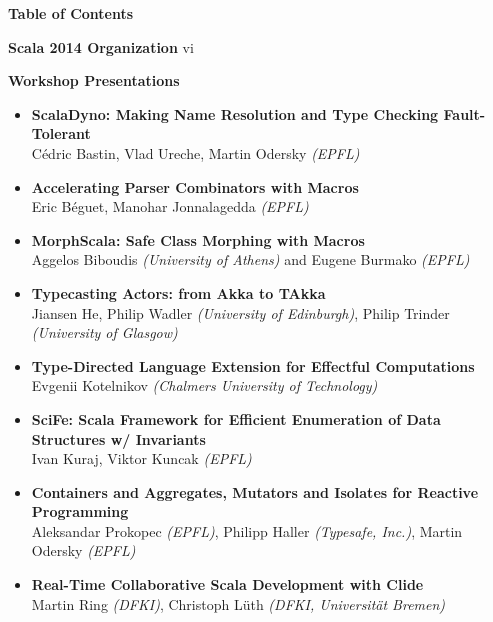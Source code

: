 \documentclass[10pt]{book}
\title{}
\date{}
\begin{document}
\thispagestyle{empty}


{\centering \LARGE \bf Table of Contents\par}

\vspace{0.5cm}
\large \textbf{Scala 2014 Organization}  vi
\normalsize

\vspace{0.5cm}
\large \textbf{Workshop Presentations}
\normalsize
\begin{itemize}
\item {\bf ScalaDyno: Making Name Resolution and Type Checking Fault-Tolerant} \\
C\'{e}dric Bastin, Vlad Ureche, Martin Odersky {\em (EPFL)}
\item {\bf Accelerating Parser Combinators with Macros} \\
Eric B\'{e}guet, Manohar Jonnalagedda {\em (EPFL)}
\item {\bf MorphScala: Safe Class Morphing with Macros} \\
Aggelos Biboudis {\em (University of Athens)} and Eugene Burmako {\em (EPFL)}
\item {\bf Typecasting Actors: from Akka to TAkka} \\
Jiansen He, Philip Wadler {\em (University of Edinburgh)}, Philip Trinder {\em (University of Glasgow)}
\item {\bf Type-Directed Language Extension for Effectful Computations} \\
Evgenii Kotelnikov {\em (Chalmers University of Technology)}
\item {\bf SciFe: Scala Framework for Efficient Enumeration of Data Structures w/ Invariants} \\
Ivan Kuraj, Viktor Kuncak {\em (EPFL)}
\item {\bf Containers and Aggregates, Mutators and Isolates for Reactive Programming} \\
Aleksandar Prokopec {\em(EPFL)}, Philipp Haller {\em(Typesafe, Inc.)}, Martin Odersky {\em(EPFL)}
\item {\bf Real-Time Collaborative Scala Development with Clide} \\
Martin Ring {\em(DFKI)}, Christoph L\"{u}th {\em(DFKI, Universit\"{a}t Bremen)}
\end{itemize}
\end{document}
